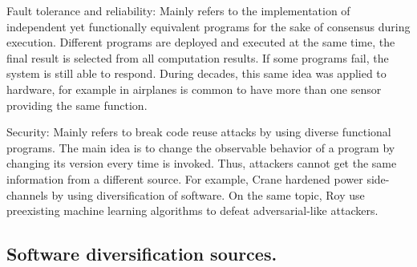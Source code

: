 \begin{goal}{Fault tolerance and reliability:}
    \label{goal:reliability}
    \normalfont
    Mainly refers to the implementation of independent yet functionally equivalent programs for the sake of consensus during execution. Different programs are deployed and executed at the same time, the final result is selected from all computation results. If some programs fail, the system is still able to respond. During decades, this same idea was applied to hardware, for example in airplanes is common to have more than one sensor providing the same function. 
\end{goal}

\begin{goal}{Security:}
    \label{goal:security}    
    \normalfont
    Mainly refers to break code reuse attacks \cite{595185} by using diverse functional programs. The main idea is to change the observable behavior of a program by changing its version every time is invoked. Thus, attackers cannot get the same information from a different source. For example, Crane \etal \cite{crane2015thwarting} hardened power side-channels by using diversification of software. On the same topic, Roy \etal \cite{10.1145/3318216.3363338} use preexisting machine learning algorithms to defeat adversarial-like attackers.
\end{goal} 







\subsection*{Software diversification sources.}

